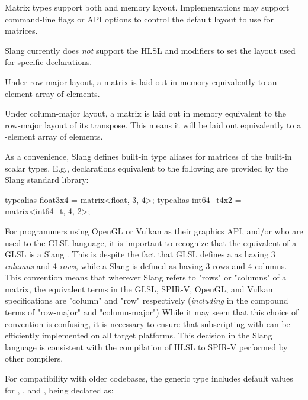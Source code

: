 Matrix types support both  and  memory layout.
Implementations may support command-line flags or API options to control the default layout to use for matrices.

\begin{Note}
Slang currently does \emph{not} support the HLSL  and  modifiers to set the layout used for specific declarations.
\end{Note}

Under row-major layout, a matrix is laid out in memory equivalently to an -element array of  elements.

Under column-major layout, a matrix is laid out in memory equivalent to the row-major layout of its transpose.
This means it will be laid out equivalently to a -element array of  elements.

As a convenience, Slang defines built-in type aliases for matrices of the built-in scalar types.
E.g., declarations equivalent to the following are provided by the Slang standard library:

\begin{codeblock}
typealias float3x4 = matrix<float, 3, 4>;
typealias int64_t4x2 = matrix<int64_t, 4, 2>;
\end{codeblock}

\begin{Note}
For programmers using OpenGL or Vulkan as their graphics API, and/or who are used to the GLSL language,
it is important to recognize that the equivalent of a GLSL  is a Slang .
This is despite the fact that GLSL defines a  as having 3 \emph{columns} and 4 \emph{rows}, while a Slang  is defined as having 3 rows and 4 columns.
This convention means that wherever Slang refers to "rows" or "columns" of a matrix, the equivalent terms in the GLSL, SPIR-V, OpenGL, and Vulkan specifications are "column" and "row" respectively (\emph{including} in the compound terms of "row-major" and "column-major")
While it may seem that this choice of convention is confusing, it is necessary to ensure that subscripting with \Char{[]} can be efficiently implemented on all target platforms.
This decision in the Slang language is consistent with the compilation of HLSL to SPIR-V performed by other compilers.
\end{Note}


For compatibility with older codebases, the generic  type includes default values for , , and , being declared as:

